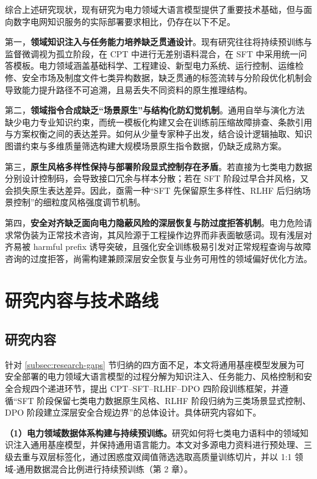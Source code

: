 \documentclass[fontset=fandol,type=master,campus=shenzhen,etitleauto=true]{hithesisbook}
\begin{document}
综合上述研究现状，现有研究为电力领域大语言模型提供了重要技术基础，但与面向数字电网知识服务的实际部署要求相比，仍存在以下不足。

第一，\textbf{领域知识注入与任务能力培养缺乏贯通设计}。现有研究往往将持续预训练与监督微调视为孤立阶段，在 CPT 中进行无差别语料混合，在 SFT 中采用统一问答模板。电力领域涵盖基础科学、工程建设、新型电力系统、运行控制、运维检修、安全市场及制度文件七类异构数据，缺乏贯通的标签流转与分阶段优化机制会导致能力提升路径不可追溯，且易丢失不同资料的原生推理结构。

第二，\textbf{领域指令合成缺乏“场景原生”与结构化防幻觉机制}。通用自举与演化方法缺少电力专业知识约束，而统一模板化构建又会在训练前压缩故障排查、条款引用与方案权衡之间的表达差异。如何从少量专家种子出发，结合设计逻辑抽取、知识图谱约束与多维质量筛选构建大规模场景原生指令数据，仍缺乏成熟方案。

第三，\textbf{原生风格多样性保持与部署阶段显式控制存在矛盾}。若直接为七类电力数据分别设计控制码，会导致接口冗余与样本分散；若在 SFT 阶段过早合并风格，又会损失原生表达差异。因此，亟需一种“SFT 先保留原生多样性、RLHF 后归纳场景控制”的细粒度风格强度调节机制。

第四，\textbf{安全对齐缺乏面向电力隐蔽风险的深层恢复与防过度拒答机制}。电力危险请求常伪装为正常技术咨询，其风险源于工程操作边界而非表面敏感词。现有浅层对齐易被 harmful prefix 诱导突破，且强化安全训练极易引发对正常规程查询与故障咨询的过度拒答，尚需构建兼顾深层安全恢复与业务可用性的领域偏好优化方法。


\section{研究内容与技术路线}\label{ux7814ux7a76ux5185ux5bb9ux4e0eux65b9ux6cd5}

\subsection{研究内容}

针对 \ref{subsec:research-gaps} 节归纳的四方面不足，本文将通用基座模型发展为可安全部署的电力领域大语言模型的过程分解为知识注入、任务能力、风格控制和安全合规四个递进环节，提出 CPT--SFT--RLHF--DPO 四阶段训练框架，并遵循“SFT 阶段保留七类电力数据原生风格、RLHF 阶段归纳为三类场景显式控制、DPO 阶段建立深层安全合规边界”的总体设计。具体研究内容如下。

\textbf{（1）电力领域数据体系构建与持续预训练。}研究如何将七类电力语料中的领域知识注入通用基座模型，并保持通用语言能力。本文对多源电力资料进行预处理、三级去重与双层标签化，通过困惑度双阈值筛选选取高质量训练切片，并以 1:1 领域-通用数据混合比例进行持续预训练（第 2 章）。
\end{document}
